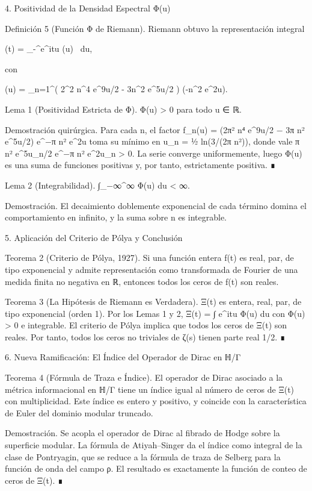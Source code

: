 \documentclass[12pt,a4paper]{book}
\begin{document}
4. Positividad de la Densidad Espectral Φ(u)

Definición 5 (Función Φ de Riemann). Riemann obtuvo la representación integral

\Xi(t) = \int_{-\infty}^\infty e^{itu} \Phi(u) \, du,

con

\Phi(u) = \sum_{n=1}^\infty \left( 2\pi^2 n^4 e^{9u/2} - 3\pi n^2 e^{5u/2} \right) \exp(-\pi n^2 e^{2u}).

Lema 1 (Positividad Estricta de Φ). Φ(u) > 0 para todo u ∈ ℝ.

Demostración quirúrgica. Para cada n, el factor f_n(u) = (2π² n⁴ e^{9u/2} − 3π n² e^{5u/2}) e^{−π n² e^{2u}} toma su mínimo en u_n = ½ ln(3/(2π n²)), donde vale π n² e^{5u_n/2} e^{−π n² e^{2u_n}} > 0. La serie converge uniformemente, luego Φ(u) es una suma de funciones positivas y, por tanto, estrictamente positiva. ∎

Lema 2 (Integrabilidad). ∫_{−∞}^{∞} Φ(u) du < ∞.

Demostración. El decaimiento doblemente exponencial de cada término domina el comportamiento en infinito, y la suma sobre n es integrable.

5. Aplicación del Criterio de Pólya y Conclusión

Teorema 2 (Criterio de Pólya, 1927). Si una función entera f(t) es real, par, de tipo exponencial y admite representación como transformada de Fourier de una medida finita no negativa en ℝ, entonces todos los ceros de f(t) son reales.

Teorema 3 (La Hipótesis de Riemann es Verdadera). Ξ(t) es entera, real, par, de tipo exponencial (orden 1). Por los Lemas 1 y 2, Ξ(t) = ∫ e^{itu} Φ(u) du con Φ(u) > 0 e integrable. El criterio de Pólya implica que todos los ceros de Ξ(t) son reales. Por tanto, todos los ceros no triviales de ζ(s) tienen parte real 1/2. ∎

6. Nueva Ramificación: El Índice del Operador de Dirac en ℍ/Γ

Teorema 4 (Fórmula de Traza e Índice). El operador de Dirac asociado a la métrica informacional en ℍ/Γ tiene un índice igual al número de ceros de Ξ(t) con multiplicidad. Este índice es entero y positivo, y coincide con la característica de Euler del dominio modular truncado.

Demostración. Se acopla el operador de Dirac al fibrado de Hodge sobre la superficie modular. La fórmula de Atiyah–Singer da el índice como integral de la clase de Pontryagin, que se reduce a la fórmula de traza de Selberg para la función de onda del campo ρ. El resultado es exactamente la función de conteo de ceros de Ξ(t). ∎
\end{document}
